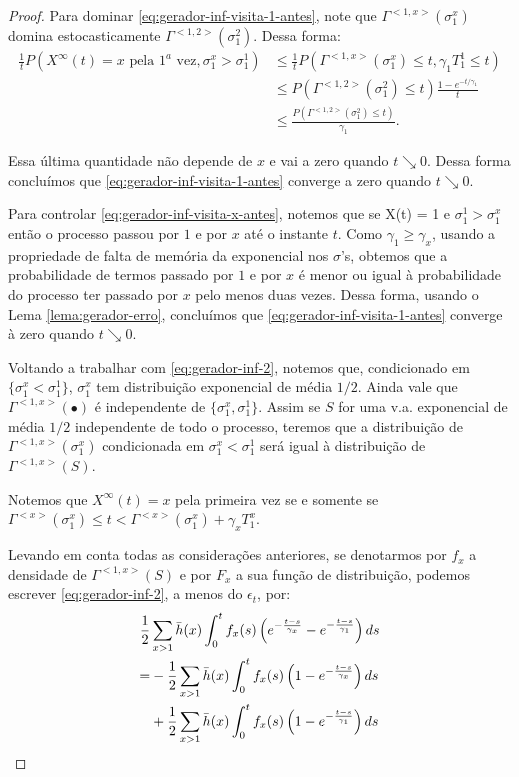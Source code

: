 \begin{proof}
  Para dominar \eqref{eq:gerador-inf-visita-1-antes}, note que
  $\Gamma^{<1, x>}(\sigma_1^x)$ domina estocasticamente $\Gamma^{<1,
    2>}(\sigma_1^2)$. Dessa forma:
  \begin{align*}
    \frac{1}{t} P\left(
      X^\infty(t) = x \text{ pela } 1^a \text{ vez},
      \sigma^x_1 > \sigma^1_1
    \right)
    & \leq \frac{1}{t} P(\Gamma^{<1, x>}(\sigma^x_1) \leq t, \gamma_1 T^1_1 \leq
    t)\\
    &\leq P(\Gamma^{<1, 2>}(\sigma^2_1) \leq t) \frac{1 -
      e^{-t/\gamma_1}}{t}\\
    &\leq \frac{P(\Gamma^{<1, 2>}(\sigma^2_1) \leq t)}{\gamma_1}.
  \end{align*}

  Essa última quantidade não depende de $x$ e vai a zero quando $t
  \searrow 0$. Dessa forma concluímos que
  \eqref{eq:gerador-inf-visita-1-antes} converge a zero quando $t
  \searrow 0$.    

  Para controlar \eqref{eq:gerador-inf-visita-x-antes}, notemos que se
  X(t) = 1 e $\sigma_1^1 > \sigma_1^x$ então o processo passou por $1$
  e por $x$ até o instante $t$. Como $\gamma_1 \geq \gamma_x$, usando
  a propriedade de falta de memória da exponencial nos $\sigma$'s,
  obtemos que a probabilidade de termos passado por $1$ e por $x$ é
  menor ou igual à probabilidade do processo ter passado por $x$ pelo
  menos duas vezes. Dessa forma, usando o Lema
  \ref{lema:gerador-erro}, concluímos que
  \eqref{eq:gerador-inf-visita-1-antes} converge à zero quando $t
  \searrow 0$.

  
  Voltando a trabalhar com \eqref{eq:gerador-inf-2}, notemos que,
  condicionado em $\{\sigma^x_1 < \sigma^1_1\}$, $\sigma^x_1$ tem
  distribuição exponencial de média $1/2$. Ainda vale que $\Gamma^{<1,
    x>}(\bullet)$ é independente de $\{\sigma^x_1,
  \sigma^1_1\}$. Assim se $S$ for uma v.a. exponencial de média $1/2$
  independente de todo o processo, teremos que a distribuição de
  $\Gamma^{<1, x>}(\sigma_1^x)$ condicionada em $\sigma^x_1 <
  \sigma_1^1$ será igual à distribuição de $\Gamma^{<1, x>}(S)$.


  Notemos que $X^\infty(t) = x$ pela primeira vez se e somente se
  $\Gamma^{<x>}(\sigma^x_1) \leq t < \Gamma^{<x>}(\sigma^x_1) +
  \gamma_x T^x_1$.

  Levando em conta todas as considerações anteriores, se denotarmos
  por $f_x$ a densidade de $\Gamma^{<1, x>}(S)$ e por $F_x$ a sua
  função de distribuição, podemos escrever \eqref{eq:gerador-inf-2}, a
  menos do $\epsilon_t$, por:
  \begin{align}
     \frac{1}{2} &\sum_{x > 1} \bar{h}(x) \int_0^t f_x (s) \left(
      e^{-\frac{t-s}{\gamma_x}} - e^{-\frac{t-s}{\gamma_1}}
    \right) d s \notag\\
    \label{eq:gerador-inf-3}
    = &- \frac{1}{2} \sum_{x > 1} \bar{h}(x) \int_0^t f_x (s) \left(
      1 - e^{-\frac{t-s}{\gamma_x}}
    \right) d s\\
    \label{eq:gerador-inf-4}
    &+ \frac{1}{2} \sum_{x > 1} \bar{h}(x) \int_0^t f_x (s) \left(
      1 - e^{-\frac{t-s}{\gamma_1}}
    \right) d s
  \end{align}


\end{proof}
